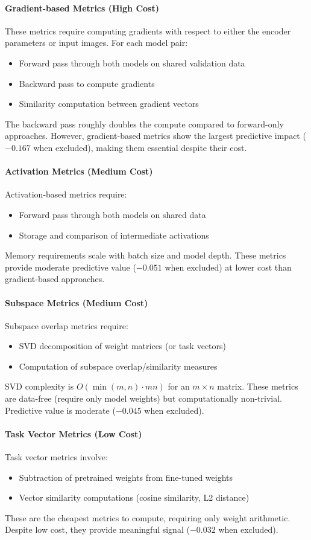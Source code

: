 \paragraph{Gradient-based Metrics (High Cost)}
These metrics require computing gradients with respect to either the encoder parameters or input images. For each model pair:
\begin{itemize}
    \item Forward pass through both models on shared validation data
    \item Backward pass to compute gradients
    \item Similarity computation between gradient vectors
\end{itemize}
The backward pass roughly doubles the compute compared to forward-only approaches. However, gradient-based metrics show the largest predictive impact ($-0.167$ when excluded), making them essential despite their cost.

\paragraph{Activation Metrics (Medium Cost)}
Activation-based metrics require:
\begin{itemize}
    \item Forward pass through both models on shared data
    \item Storage and comparison of intermediate activations
\end{itemize}
Memory requirements scale with batch size and model depth. These metrics provide moderate predictive value ($-0.051$ when excluded) at lower cost than gradient-based approaches.

\paragraph{Subspace Metrics (Medium Cost)}
Subspace overlap metrics require:
\begin{itemize}
    \item SVD decomposition of weight matrices (or task vectors)
    \item Computation of subspace overlap/similarity measures
\end{itemize}
SVD complexity is $O(\min(m,n) \cdot mn)$ for an $m \times n$ matrix. These metrics are data-free (require only model weights) but computationally non-trivial. Predictive value is moderate ($-0.045$ when excluded).

\paragraph{Task Vector Metrics (Low Cost)}
Task vector metrics involve:
\begin{itemize}
    \item Subtraction of pretrained weights from fine-tuned weights
    \item Vector similarity computations (cosine similarity, L2 distance)
\end{itemize}
These are the cheapest metrics to compute, requiring only weight arithmetic. Despite low cost, they provide meaningful signal ($-0.032$ when excluded).

